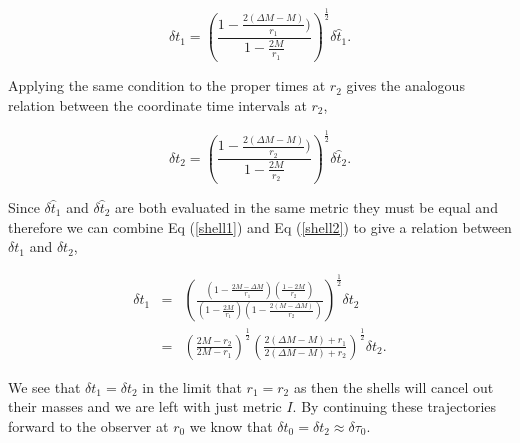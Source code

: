 \documentclass[aps,showpacs,twocolumn,floats,prd,superscriptaddress,nofootinbib]{revtex4-1}
\begin{document}
\begin{equation}
	\delta t_1 = \left( \frac{1 - \frac{ 2(\Delta M -M)}{r_1})}{1 - \frac{ 2M}{r_1}}  \right)^\frac{1}{2} \delta \hat{t}_1.	\label{shell1}
\end{equation}

Applying the same condition to the proper times at $r_2$ gives the analogous relation between the coordinate time intervals at $r_2$, 

\begin{equation}
	\delta t_2 = \left( \frac{1 - \frac{ 2(\Delta M -M)}{r_2})}{1 - \frac{ 2M}{r_2}}  \right)^\frac{1}{2} \delta \hat{t}_2. 	\label{shell2}
\end{equation}

Since $\delta \hat{t}_1$ and $\delta \hat{t}_2$ are both evaluated in the same metric they must be equal and therefore we can combine Eq (\ref{shell1}) and Eq (\ref{shell2}) to give a relation between $\delta t_1$ and $\delta t_2$, 

\begin{eqnarray}
	\delta t_{1} & = & \left( \frac{ \left( 1 - \frac{2 M - \Delta M}{r_{1}} \right) \left( \frac{1 - 2M}{r_{2}} \right)}{\left( 1 - \frac{2M}{r_{1}} \right)  \left( 1 - \frac{2(M - \Delta M)}{r_{2}} \right)} \right)^\frac{1}{2} \delta t_{2}	\nonumber	\\
	& = & \left( \frac{2M - r_2}{2M - r_1} \right)^\frac{1}{2} \left( \frac{ 2(\Delta M - M) + r_1}{2(\Delta M - M) + r_2} \right)^\frac{1}{2} \delta {t}_{2}.
\end{eqnarray}

We see that $\delta t_1 = \delta t_2$ in the limit that $r_1 = r_2$ as then the shells will cancel out their masses and we are left with just metric $I$. By continuing these trajectories forward to the observer at $r_0$ we know that $\delta t_0 = \delta t_2 \approx \delta \tau_0$. 

\end{document}
